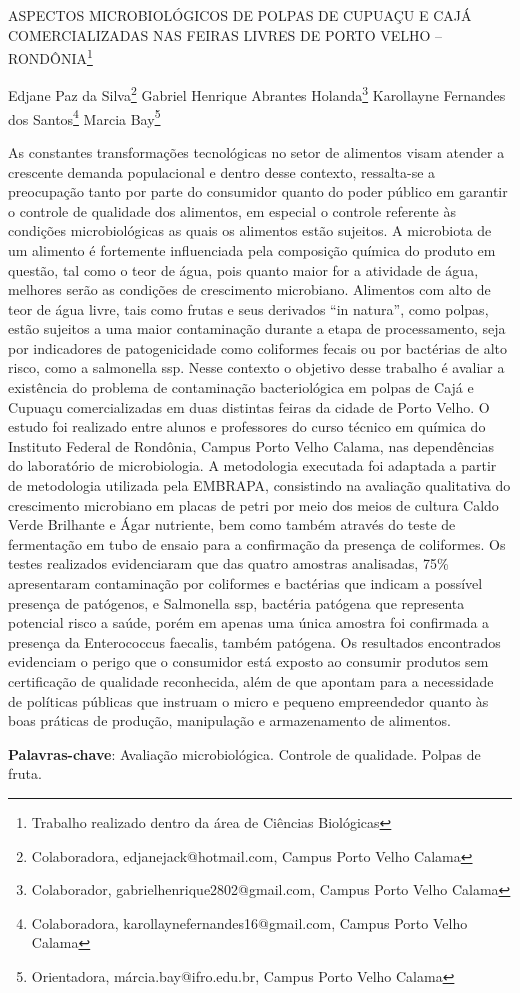 \documentclass[article,12pt,onesidea,4paper,english,brazil]{abntex2}
\begin{document}
	
	
	\frenchspacing 
	
	\begin{center}
		\LARGE ASPECTOS MICROBIOLÓGICOS DE POLPAS DE CUPUAÇU E CAJÁ
		COMERCIALIZADAS NAS FEIRAS LIVRES DE PORTO VELHO – RONDÔNIA\footnote{Trabalho realizado dentro da área de Ciências Biológicas}
		
		\normalsize
		Edjane Paz da Silva\footnote{Colaboradora, edjanejack@hotmail.com, Campus Porto Velho Calama} 
		Gabriel Henrique Abrantes Holanda\footnote{Colaborador, gabrielhenrique2802@gmail.com, Campus Porto Velho Calama} 
		Karollayne Fernandes dos Santos\footnote{Colaboradora, karollaynefernandes16@gmail.com, Campus Porto Velho Calama} 
		Marcia Bay\footnote{Orientadora, márcia.bay@ifro.edu.br, Campus Porto Velho Calama} 
	\end{center}
	
	\noindent As constantes transformações tecnológicas no setor de alimentos visam atender a
	crescente demanda populacional e dentro desse contexto, ressalta-se a
	preocupação tanto por parte do consumidor quanto do poder público em garantir o
	controle de qualidade dos alimentos, em especial o controle referente às condições
	microbiológicas as quais os alimentos estão sujeitos. A microbiota de um alimento é
	fortemente influenciada pela composição química do produto em questão, tal como o
	teor de água, pois quanto maior for a atividade de água, melhores serão as
	condições de crescimento microbiano. Alimentos com alto de teor de água livre, tais
	como frutas e seus derivados “in natura”, como polpas, estão sujeitos a uma maior
	contaminação durante a etapa de processamento, seja por indicadores de
	patogenicidade como coliformes fecais ou por bactérias de alto risco, como a
	salmonella ssp. Nesse contexto o objetivo desse trabalho é avaliar a existência do
	problema de contaminação bacteriológica em polpas de Cajá e Cupuaçu
	comercializadas em duas distintas feiras da cidade de Porto Velho. O estudo foi
	realizado entre alunos e professores do curso técnico em química do Instituto
	Federal de Rondônia, Campus Porto Velho Calama, nas dependências do
	laboratório de microbiologia. A metodologia executada foi adaptada a partir de
	metodologia utilizada pela EMBRAPA, consistindo na avaliação qualitativa do
	crescimento microbiano em placas de petri por meio dos meios de cultura Caldo
	Verde Brilhante e Ágar nutriente, bem como também através do teste de
	fermentação em tubo de ensaio para a confirmação da presença de coliformes. Os
	testes realizados evidenciaram que das quatro amostras analisadas, 75\%
	apresentaram contaminação por coliformes e bactérias que indicam a possível
	presença de patógenos, e Salmonella ssp, bactéria patógena que representa
	potencial risco a saúde, porém em apenas uma única amostra foi confirmada a
	presença da Enterococcus faecalis, também patógena. Os resultados encontrados
	evidenciam o perigo que o consumidor está exposto ao consumir produtos sem
	certificação de qualidade reconhecida, além de que apontam para a necessidade de
	políticas públicas que instruam o micro e pequeno empreendedor quanto às boas
	práticas de produção, manipulação e armazenamento de alimentos.
	
	\vspace{\onelineskip}
	
	\noindent
	\textbf{Palavras-chave}: Avaliação microbiológica. Controle de qualidade. Polpas de fruta.
	
\end{document}
